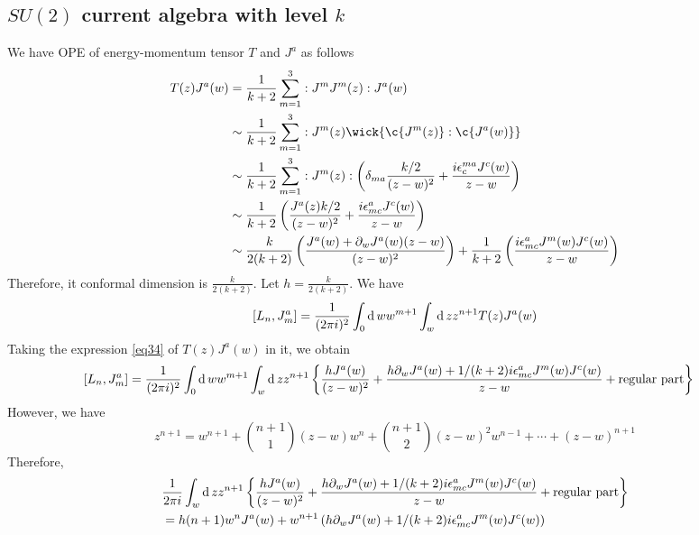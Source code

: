 \subsection{$SU(2)$ current algebra with level $k$}
We have OPE of energy-momentum tensor $T$ and $J^a$ as follows
\begin{equation}
\label{eq34}
	\begin{split}
	T(z) J^a(w) & = \frac{1}{k+2} \sum_{m=1}^3 : J^m J^m (z):J^a(w)\\
	& \sim \frac{1}{k+2} \sum_{m=1}^3 : J^m(z) \wick{\c{J^m(z)} : \c{J^a(w)} }\\
	& \sim \frac{1}{k+2} \sum_{m=1}^3 : J^m(z): \left(\delta_{ma}\frac{k/2 }{(z-w)^2} + \frac{i \epsilon^{ma}_c J^c(w)}{z-w} \right)\\
	& \sim \frac{1}{k+2} \left(\frac{J^a(z)k/2}{(z-w)^2} + \frac{i \epsilon^{a}_{mc} J^c(w) }{z-w} \right)\\
	& \sim \frac{k}{2(k+2)} \left(\frac{J^a(w) + \partial_wJ^a(w)(z-w) }{(z-w)^2} \right) + \frac{1}{k+2}\left( \frac{i \epsilon^{a}_{mc}J^m(w)J^c(w) }{z-w} \right)
	\end{split}
\end{equation}
Therefore, it conformal dimension is $\frac{k}{2(k+2)}$. Let $h= \frac{k}{2(k+2)}$. We have 
\[
[L_n, J^a_m] = \frac{1}{(2\pi i)^2} \int_0 \operatorname{d} w w^{m+1} \int_w \operatorname{d} z z^{n+1} T(z) J^a(w)
\]
Taking the expression \ref{eq34} of $T(z)J^a(w)$ in it, we obtain
\begin{equation}
	\begin{split}
	[L_n,J^a_m]&= \frac{1}{(2\pi i)^2} \int_0 \operatorname{d} w w^{m+1} \int_{w} \operatorname{d} z z^{n+1} \left\{\frac{h J^a(w)}{(z-w)^2} + \frac{h\partial_w J^a(w) + 1/(k+2) i \epsilon^a_{mc}J^m(w)J^c(w)}{z-w} + \text{regular part}\right\}
	\end{split}
\end{equation}
However, we have 
\begin{equation}
	z^{n+1} = w^{n+1} + \binom{n+1}{1}(z-w) w^n + \binom{n+1}{2}(z-w)^2 w^{n-1} + \cdots + (z-w)^{n+1}
\end{equation}
Therefore, 
\begin{equation}
	\begin{split}
	&\frac{1}{2\pi i}\int_{w} \operatorname{d} z z^{n+1} \left\{\frac{h J^a(w)}{(z-w)^2} + \frac{h\partial_w J^a(w) + 1/(k+2) i \epsilon^a_{mc}J^m(w)J^c(w)}{z-w} + \text{regular part}\right\}\\
	&= h(n+1) w^n J^a(w) + w^{n+1} \left(  h\partial_w J^a(w) + 1/(k+2) i \epsilon^a_{mc}J^m(w)J^c(w) \right)
	\end{split}
\end{equation}
